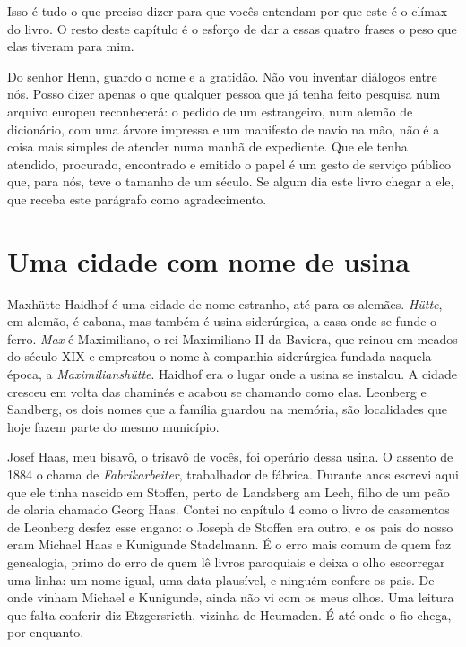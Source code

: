 \documentclass[
  brazilian,
  11pt,
  openany]{book}
\begin{document}
Isso é tudo o que preciso dizer para que vocês entendam por que este é o
clímax do livro. O resto deste capítulo é o esforço de dar a essas
quatro frases o peso que elas tiveram para mim.

Do senhor Henn, guardo o nome e a gratidão. Não vou inventar diálogos
entre nós. Posso dizer apenas o que qualquer pessoa que já tenha feito
pesquisa num arquivo europeu reconhecerá: o pedido de um estrangeiro,
num alemão de dicionário, com uma árvore impressa e um manifesto de
navio na mão, não é a coisa mais simples de atender numa manhã de
expediente. Que ele tenha atendido, procurado, encontrado e emitido o
papel é um gesto de serviço público que, para nós, teve o tamanho de um
século. Se algum dia este livro chegar a ele, que receba este parágrafo
como agradecimento.

\section{Uma cidade com nome de
usina}\label{uma-cidade-com-nome-de-usina}

Maxhütte-Haidhof é uma cidade de nome estranho, até para os alemães.
\emph{Hütte}, em alemão, é cabana, mas também é usina siderúrgica, a
casa onde se funde o ferro. \emph{Max} é Maximiliano, o rei Maximiliano
II da Baviera, que reinou em meados do século XIX e emprestou o nome à
companhia siderúrgica fundada naquela época, a \emph{Maximilianshütte}.
Haidhof era o lugar onde a usina se instalou. A cidade cresceu em volta
das chaminés e acabou se chamando como elas. Leonberg e Sandberg, os
dois nomes que a família guardou na memória, são localidades que hoje
fazem parte do mesmo município.

Josef Haas, meu bisavô, o trisavô de vocês, foi operário dessa usina. O
assento de 1884 o chama de \emph{Fabrikarbeiter}, trabalhador de
fábrica. Durante anos escrevi aqui que ele tinha nascido em Stoffen,
perto de Landsberg am Lech, filho de um peão de olaria chamado Georg
Haas. Contei no capítulo 4 como o livro de casamentos de Leonberg desfez
esse engano: o Joseph de Stoffen era outro, e os pais do nosso eram
Michael Haas e Kunigunde Stadelmann. É o erro mais comum de quem faz
genealogia, primo do erro de quem lê livros paroquiais e deixa o olho
escorregar uma linha: um nome igual, uma data plausível, e ninguém
confere os pais. De onde vinham Michael e Kunigunde, ainda não vi com os
meus olhos. Uma leitura que falta conferir diz Etzgersrieth, vizinha de
Heumaden. É até onde o fio chega, por enquanto.
\end{document}
